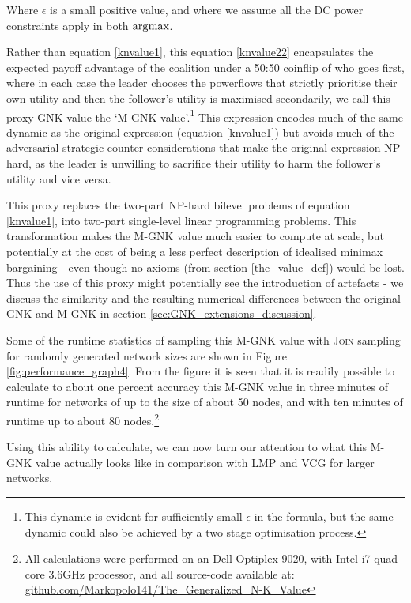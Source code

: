 Where $\epsilon$ is a small positive value, and where we assume all the DC power constraints apply in both $\operatorname*{\arg\!\max}$.

Rather than equation \eqref{knvalue1}, this equation \eqref{knvalue22} encapsulates the expected payoff advantage of the coalition under a 50:50 coinflip of who goes first, where in each case the leader chooses the powerflows that strictly prioritise their own utility and then the follower's utility is maximised secondarily, we call this proxy GNK value the `M-GNK value'.\footnote{This dynamic is evident for sufficiently small $\epsilon$ in the formula, but the same dynamic could also be achieved by a two stage optimisation process.}
This expression encodes much of the same dynamic as the original expression (equation \ref{knvalue1}) but avoids much of the adversarial strategic counter-considerations that make the original expression NP-hard, as the leader is unwilling to sacrifice their utility to harm the follower's utility and vice versa.

This proxy replaces the two-part NP-hard bilevel problems of equation \ref{knvalue1}, into two-part single-level linear programming problems.
This transformation makes the M-GNK value much easier to compute at scale, but potentially at the cost of being a less perfect description of idealised minimax bargaining - even though no axioms (from section \ref{the_value_def}) would be lost.
Thus the use of this proxy might potentially see the introduction of artefacts - we discuss the similarity and the resulting numerical differences between the original GNK and M-GNK in section \ref{sec:GNK_extensions_discussion}.

Some of the runtime statistics of sampling this M-GNK value with \textsc{Join} sampling for randomly generated network sizes are shown in Figure \ref{fig:performance_graph4}.
From the figure it is seen that it is readily possible to calculate to about one percent accuracy this M-GNK value in three minutes of runtime for networks of up to the size of about 50 nodes, and with ten minutes of runtime up to about 80 nodes.\footnote{\label{note1} All calculations were performed on an Dell Optiplex 9020, with Intel i7 quad core 3.6GHz processor, and all source-code available at:\\
\href{https://github.com/Markopolo141/The\_Generalized\_N-K\_Value}{github.com/Markopolo141/The\_Generalized\_N-K\_Value}}

Using this ability to calculate, we can now turn our attention to what this M-GNK value actually looks like in comparison with LMP and VCG for larger networks.


